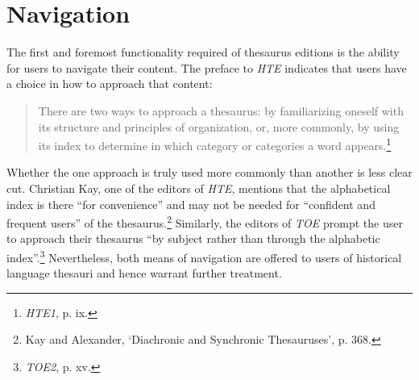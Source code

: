 \section{Navigation}
\label{sect:Stolk_thes-functionality:navigation}

The first and foremost functionality required of thesaurus editions is the ability for users to navigate their content. The preface to \textit{HTE} indicates that users have a choice in how to approach that content:
\begin{quotation}\noindent
There are two ways to approach a thesaurus: by familiarizing oneself with its structure and principles of organization, or, more commonly, by using its index to determine in which category or categories a word appears.\footnote{\textit{HTE1}, p. ix.}
\end{quotation}
Whether the one approach is truly used more commonly than another is less clear cut. Christian Kay, one of the editors of \textit{HTE}, mentions that the alphabetical index is there ``for convenience'' and may not be needed for ``confident and frequent users'' of the thesaurus.\footnote{Kay and Alexander, `Diachronic and Synchronic Thesauruses', p. 368.} Similarly, the editors of \textit{TOE} prompt the user to approach their thesaurus ``by subject rather than through the alphabetic index''.\footnote{\textit{TOE2}, p. xv.} Nevertheless, both means of navigation are offered to users of historical language thesauri and hence warrant further treatment.

